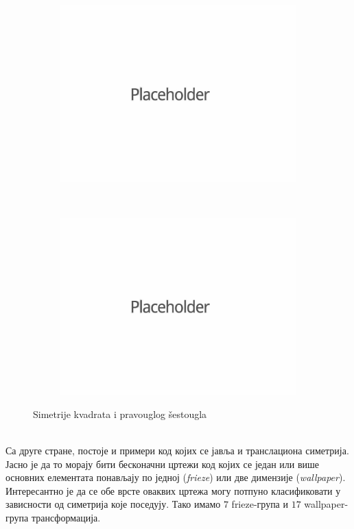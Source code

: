 \documentclass{report}
\theoremstyle{plain}
\theoremstyle{definition}
\begin{document}
\begin{figure}[h]
\centering
\begin{subfigure}{0.4\textwidth}
\includegraphics[width=\textwidth]{placeholder}
\end{subfigure}
~
\begin{subfigure}{0.4\textwidth}
\includegraphics[width=\textwidth]{placeholder}
\end{subfigure}
\caption{Simetrije kvadrata i pravouglog \v sestougla}
\end{figure}\\
Са друге стране, постоје и примери код којих се јавља и транслациона симетрија. Јасно је да то морају бити бесконачни цртежи код којих се један или више основних елементата понављају по једној (\emph{frieze}) или две димензије (\emph{wallpaper}). Интересантно је да се обе врсте оваквих цртежа могу потпуно класификовати у зависности од симетрија које поседују. Тако имамо $7$ frieze-група и $17$ wallpaper-група трансформација.
\end{document}
